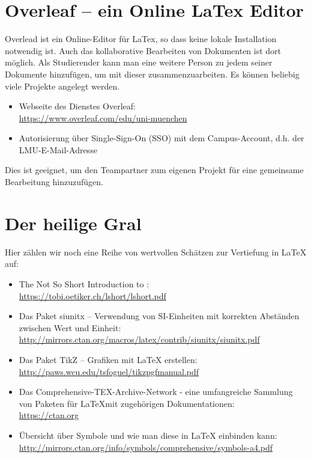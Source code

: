 \documentclass[a4paper,10pt]{report}
\begin{document}
	\section{Overleaf -- ein Online LaTex Editor}

	Overlead ist ein Online-Editor für LaTex, so dass keine lokale Installation notwendig ist. Auch das kollaborative Bearbeiten von Dokumenten ist dort möglich. Als Studierender kann man eine weitere Person zu jedem seiner Dokumente hinzufügen, um mit dieser zusammenzuarbeiten. Es können beliebig viele Projekte angelegt werden.
	
	\begin{itemize}
		\item Webseite des Dienstes Overleaf: \\\url{https://www.overleaf.com/edu/uni-muenchen}
		\item Autorisierung über Single-Sign-On (SSO) mit dem Campus-Account, d.h. der LMU-E-Mail-Adresse
	\end{itemize}
	
	Dies ist geeignet, um den Teampartner zum eigenen Projekt für eine gemeinsame Bearbeitung hinzuzufügen.		
	
	\section{Der heilige Gral}
	
	Hier zählen wir noch eine Reihe von wertvollen Schätzen zur Vertiefung in
	\LaTeX{} auf:
	\begin{itemize}
		\item The Not So Short Introduction to \LaTeXe:
		\\\url{https://tobi.oetiker.ch/lshort/lshort.pdf}
		\item Das Paket siunitx -- Verwendung von SI-Einheiten mit korrekten Abständen
		zwischen Wert und Einheit:
		\url{http://mirrors.ctan.org/macros/latex/contrib/siunitx/siunitx.pdf}
		\item Das Paket TikZ -- Grafiken mit \LaTeX{} erstellen:
		\\\url{http://paws.wcu.edu/tsfoguel/tikzpgfmanual.pdf}
		\item Das Comprehensive-TEX-Archive-Network - eine umfangreiche Sammlung von
		Paketen für \LaTeX mit zugehörigen Dokumentationen: \\\url{https://ctan.org}
		\item Übersicht über Symbole und wie man diese in LaTeX einbinden kann: \\\url{http://mirrors.ctan.org/info/symbols/comprehensive/symbols-a4.pdf}
	\end{itemize}
	
	
\end{document}
